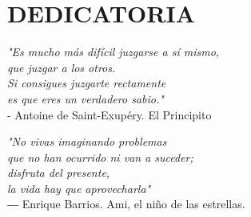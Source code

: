 \chapter*{DEDICATORIA}

\vspace{2cm}

\begin{flushright}
    \textit{
        "Es mucho más difícil juzgarse a sí mismo,\\ 
        que juzgar a los otros.\\
        Si consigues juzgarte rectamente \\ 
        es que eres un verdadero sabio."\\
    }
    - Antoine de Saint-Exupéry. El Principito \\
    \vspace{2cm}
    
    \textit{"No vivas imaginando problemas \\
        que no han ocurrido ni van a suceder; \\
        disfruta del presente, \\
        la vida hay que aprovecharla"\\
    }
    ― Enrique Barrios. Ami, el niño de las estrellas.

\end{flushright}
